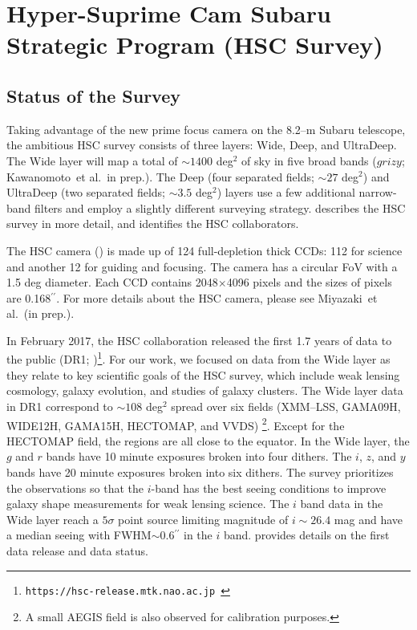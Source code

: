 \documentclass[useamsfonts]{pasj01}
\def\asec{$^{\prime\prime}$}
\def\etal{{\ et al.~}}
\begin{document}
\section{Hyper-Suprime Cam Subaru Strategic Program (HSC Survey)}
    \label{sec:ssp}

\subsection{Status of the Survey}
    \label{ssec:ssp}
    
    Taking advantage of the new prime focus camera on the 8.2--m Subaru telescope,
    the ambitious HSC survey consists of three layers: Wide, Deep, and UltraDeep.
    The Wide layer will map a total of ${\sim}1400$ deg$^2$ of sky in five broad bands
    ($grizy$; Kawanomoto\etal in prep.).
    The Deep (four separated fields; ${\sim}27$ deg$^2$) and UltraDeep (two separated
    fields; ${\sim}3.5$ deg$^2$) layers use a few additional narrow-band filters
    and employ a slightly different surveying strategy.
    \citet{HSCOverview} describes the HSC survey in more detail, and identifies the
    HSC collaborators.

    The HSC camera (\citealt{Miyazaki2012}) is made up of 124 full-depletion thick
    CCDs: 112 for science and another 12 for guiding and focusing.
    The camera has a circular FoV with a 1.5 deg diameter.
    Each CCD contains 2048$\times$4096 pixels and the sizes of pixels are 
    0.168\asec{}.
    For more details about the HSC camera, please see Miyazaki\etal (in prep.).

    In February 2017, the HSC collaboration released the first 1.7 years of data to
    the public (DR1;
    \citealt{HSCDR1})\footnote{\texttt{https://hsc-release.mtk.nao.ac.jp }}.
    For our work, we focused on data from the Wide layer as they relate to key
    scientific goals of the HSC survey, which include weak lensing cosmology, galaxy 
    evolution, and studies of galaxy clusters. 
    The Wide layer data in DR1 correspond to ${\sim}108$ deg$^2$ spread over 
    six fields (XMM--LSS, GAMA09H, WIDE12H, GAMA15H, HECTOMAP, and VVDS)
    \footnote{A small AEGIS field is also observed for calibration purposes.}.
    Except for the HECTOMAP field, the regions are all close to the equator.
    In the Wide layer, the $g$ and $r$ bands have 10 minute exposures broken into 
    four dithers.  
    The $i$, $z$, and $y$ bands have 20 minute exposures broken into six dithers. 
    The survey prioritizes the observations so that the $i$-band has the best seeing 
    conditions to improve galaxy shape measurements for weak lensing science. 
    The $i$ band data in the Wide layer reach a $5\sigma$ point source limiting 
    magnitude of $i{\sim} 26.4$ mag and have a median seeing with 
    FWHM${\sim}0.6$\asec{} in the $i$ band. 
    \citealt{HSCDR1} provides details on the first data release and data status.
\end{document}
